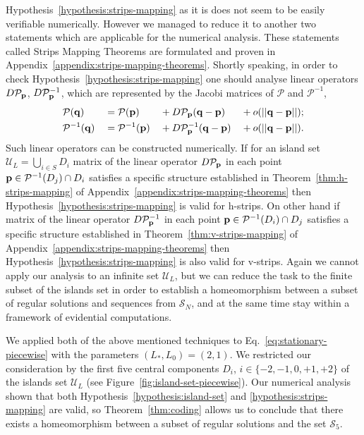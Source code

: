 Hypothesis~\ref{hypothesis:strips-mapping} as it is does not seem to be easily verifiable numerically.
However we managed to reduce it to another two statements which are applicable for the numerical analysis.
These statements called Strips Mapping Theorems are formulated and proven in Appendix~\ref{appendix:strips-mapping-theorems}.
Shortly speaking, in order to check Hypothesis~\ref{hypothesis:strips-mapping} one should analyse linear operators $D \mathcal{P}_{\vb{p}}$, $D \mathcal{P}^{-1}_{\vb{p}}$, which are represented by the Jacobi matrices of $\mathcal{P}$ and $\mathcal{P}^{-1}$, 
\begin{alignat}{4}
	& \mathcal{P}(\vb{q}) && = \mathcal{P}(\vb{p}) && + D \mathcal{P}_{\vb{p}} (\vb{q} - \vb{p}) && + o(||\vb{q} - \vb{p}||); \\
	& \mathcal{P}^{-1}(\vb{q}) && = \mathcal{P}^{-1}(\vb{p}) && + D \mathcal{P}^{-1}_{\vb{p}} (\vb{q} - \vb{p}) && + o(||\vb{q} - \vb{p}||).
\end{alignat}
Such linear operators can be constructed numerically.
If for an island set $\mathscr{U}_L = \bigcup_{i \in S} D_i$ matrix of the linear operator $D \mathcal{P}_{\vb{p}}$ in each point $\vb{p} \in \mathcal{P}^{-1}(D_j) \cap D_i$ satisfies a specific structure established in Theorem~\ref{thm:h-strips-mapping} of Appendix~\ref{appendix:strips-mapping-theorems} then Hypothesis~\ref{hypothesis:strips-mapping} is valid for h-strips.
On other hand if matrix of the linear operator $D \mathcal{P}^{-1}_{\vb{p}}$ in each point $\vb{p} \in \mathcal{P}^{-1}(D_i) \cap D_j$ satisfies a specific structure established in Theorem~\ref{thm:v-strips-mapping} of Appendix~\ref{appendix:strips-mapping-theorems} then Hypothesis~\ref{hypothesis:strips-mapping} is also valid for v-strips.
Again we cannot apply our analysis to an infinite set $\mathscr{U}_L$, but we can reduce the task to the finite subset of the islands set in order to establish a homeomorphism between a subset of regular solutions and sequences from $\mathcal{S}_N$, and at the same time stay within a framework of evidential computations.

We applied both of the above mentioned techniques to Eq.~\eqref{eq:stationary-piecewise} with the parameters $(L_*, L_0) = (2, 1)$.
We restricted our consideration by the first five central components $D_i$, $i \in \{ -2, -1, 0, +1, +2 \}$ of the islands set $\mathscr{U}_L$ (see Figure~\ref{fig:island-set-piecewise}).
Our numerical analysis shown that both Hypothesis~\ref{hypothesis:island-set} and \ref{hypothesis:strips-mapping} are valid, so Theorem~\ref{thm:coding} allows us to conclude that there exists a homeomorphism between a subset of regular solutions and the set $\mathcal{S}_5$.

